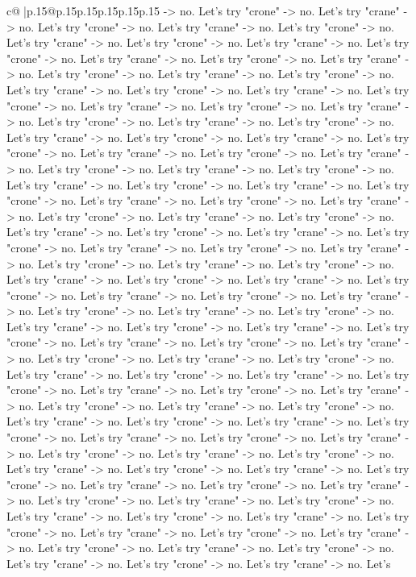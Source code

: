\documentclass{article}
\begin{document}
{\begin{supertabular}{c@{$\;$}|p{.15\linewidth}@{}p{.15\linewidth}p{.15\linewidth}p{.15\linewidth}p{.15\linewidth}p{.15\linewidth}}
{{{{-}> no. Let's try "crone" {-}> no. Let's try "crane" {-}> no. Let's try "crone" {-}> no. Let's try "crane" {-}> no. Let's try "crone" {-}> no. Let's try "crane" {-}> no. Let's try "crone" {-}> no. Let's try "crane" {-}> no. Let's try "crone" {-}> no. Let's try "crane" {-}> no. Let's try "crone" {-}> no. Let's try "crane" {-}> no. Let's try "crone" {-}> no. Let's try "crane" {-}> no. Let's try "crone" {-}> no. Let's try "crane" {-}> no. Let's try "crone" {-}> no. Let's try "crane" {-}> no. Let's try "crone" {-}> no. Let's try "crane" {-}> no. Let's try "crone" {-}> no. Let's try "crane" {-}> no. Let's try "crone" {-}> no. Let's try "crane" {-}> no. Let's try "crone" {-}> no. Let's try "crane" {-}> no. Let's try "crone" {-}> no. Let's try "crane" {-}> no. Let's try "crone" {-}> no. Let's try "crane" {-}> no. Let's try "crone" {-}> no. Let's try "crane" {-}> no. Let's try "crone" {-}> no. Let's try "crane" {-}> no. Let's try "crone" {-}> no. Let's try "crane" {-}> no. Let's try "crone" {-}> no. Let's try "crane" {-}> no. Let's try "crone" {-}> no. Let's try "crane" {-}> no. Let's try "crone" {-}> no. Let's try "crane" {-}> no. Let's try "crone" {-}> no. Let's try "crane" {-}> no. Let's try "crone" {-}> no. Let's try "crane" {-}> no. Let's try "crone" {-}> no. Let's try "crane" {-}> no. Let's try "crone" {-}> no. Let's try "crane" {-}> no. Let's try "crone" {-}> no. Let's try "crane" {-}> no. Let's try "crone" {-}> no. Let's try "crane" {-}> no. Let's try "crone" {-}> no. Let's try "crane" {-}> no. Let's try "crone" {-}> no. Let's try "crane" {-}> no. Let's try "crone" {-}> no. Let's try "crane" {-}> no. Let's try "crone" {-}> no. Let's try "crane" {-}> no. Let's try "crone" {-}> no. Let's try "crane" {-}> no. Let's try "crone" {-}> no. Let's try "crane" {-}> no. Let's try "crone" {-}> no. Let's try "crane" {-}> no. Let's try "crone" {-}> no. Let's try "crane" {-}> no. Let's try "crone" {-}> no. Let's try "crane" {-}> no. Let's try "crone" {-}> no. Let's try "crane" {-}> no. Let's try "crone" {-}> no. Let's try "crane" {-}> no. Let's try "crone" {-}> no. Let's try "crane" {-}> no. Let's try "crone" {-}> no. Let's try "crane" {-}> no. Let's try "crone" {-}> no. Let's try "crane" {-}> no. Let's try "crone" {-}> no. Let's try "crane" {-}> no. Let's try "crone" {-}> no. Let's try "crane" {-}> no. Let's try "crone" {-}> no. Let's try "crane" {-}> no. Let's try "crone" {-}> no. Let's try "crane" {-}> no. Let's try "crone" {-}> no. Let's try "crane" {-}> no. Let's try "crone" {-}> no. Let's try "crane" {-}> no. Let's try "crone" {-}> no. Let's try "crane" {-}> no. Let's try "crone" {-}> no. Let's try "crane" {-}> no. Let's try "crone" {-}> no. Let's try "crane" {-}> no. Let's try "crone" {-}> no. Let's try "crane" {-}> no. Let's try "crone" {-}> no. Let's try "crane" {-}> no. Let's try "crone" {-}> no. Let's try "crane" {-}> no. Let's try "crone" {-}> no. Let's try "crane" {-}> no. Let's try "crone" {-}> no. Let's try "crane" {-}> no. Let's try "crone" {-}> no. Let's try "crane" {-}> no. Let's try "crone" {-}> no. Let's try "crane" {-}> no. Let's try "crone" {-}> no. Let's try "crane" {-}> no. Let's try "crone" {-}> no. Let's try "crane" {-}> no. Let's }}}
\end{supertabular}}
\end{document}
